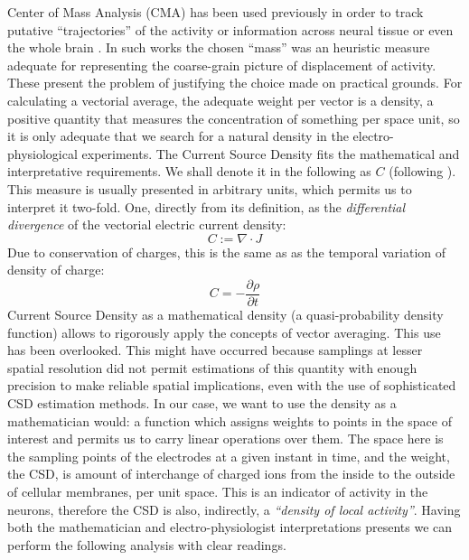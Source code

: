 \documentclass[11pt, letterpaper]{article}
\begin{document}
Center of Mass Analysis (CMA) has been used previously in order to track putative  ``trajectories'' of the activity or information across neural tissue or even the whole brain \cite{Chao05, Chao07, Manjarrez07, Manjarrez09}. In such works the chosen ``mass'' was an heuristic measure adequate for representing the coarse-grain picture of displacement of activity. These present the problem of justifying the choice made on practical grounds. For calculating a vectorial average, the adequate weight per vector is a density, a positive quantity that measures the concentration of something per space unit, so it is only adequate that we search for a natural density in the electro-physiological experiments. The Current Source Density fits the mathematical and interpretative requirements. We shall denote it in the following as $C$ (following \cite{Potworowski2011}).  This measure is usually presented in arbitrary units, which permits us to interpret it two-fold. One, directly from its definition, as the \emph{differential divergence} of the vectorial electric current density:
\begin{equation}
  C:=\nabla \cdot J
\end{equation}
Due to conservation of charges, this is the same as as the temporal variation of density of charge:
\begin{equation}
  C=-\frac{\partial \rho}{\partial t}
\end{equation}
Current Source Density as a mathematical density (a quasi-probability density function)  allows  to rigorously apply the concepts of vector averaging. This use has been overlooked. This might have occurred because  samplings at lesser spatial resolution did not permit estimations of this quantity with enough precision to make reliable spatial implications, even with the use of sophisticated CSD estimation methods. In our case, we want to use the density as a mathematician would: a function which assigns weights to points in the space of interest and permits us to carry linear operations over them.  The space here is the sampling points of the electrodes at a given instant in time, and the weight, the CSD, is amount of interchange of charged ions from the inside to the outside of cellular membranes, per unit space.  This is an indicator of activity in the neurons, therefore the CSD is also, indirectly, a \emph{``density of local activity''}. Having both
the mathematician and electro-physiologist interpretations presents we can
perform the following analysis with clear readings. 
\end{document}
